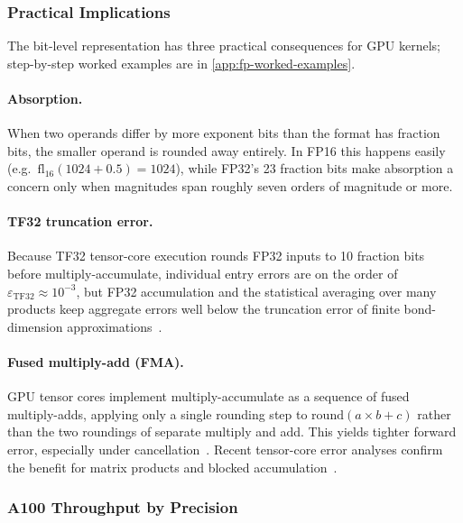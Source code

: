 \subsubsection{Practical Implications}

The bit-level representation has three practical consequences for GPU
kernels; step-by-step worked examples are in \cref{app:fp-worked-examples}.

\paragraph{Absorption.}
When two operands differ by more exponent bits than the format has fraction
bits, the smaller operand is rounded away entirely. In FP16 this happens
easily (e.g.\ $\mathrm{fl}_{16}(1024 + 0.5) = 1024$), while FP32's 23
fraction bits make absorption a concern only when magnitudes span roughly
seven orders of magnitude or more.

\paragraph{TF32 truncation error.}
Because TF32 tensor-core execution rounds FP32 inputs to 10 fraction bits
before multiply-accumulate, individual entry errors are on the order of
$\varepsilon_{\text{TF32}} \approx 10^{-3}$, but FP32 accumulation and the
statistical averaging over many products keep aggregate errors well below
the truncation error of finite bond-dimension
approximations~\cite{markidis2018tensorcore-precision,haidar2018tensorcore-ir,fasi2023multiword-tensorcore}.

\paragraph{Fused multiply-add (FMA).}
GPU tensor cores implement multiply-accumulate as a sequence of fused
multiply-adds, applying only a single rounding step to
$\mathrm{round}(a \times b + c)$ rather than the two roundings of separate
multiply and add. This yields tighter forward error, especially under
cancellation~\cite{ieee754-2019,higham2002accuracy,jeannerod2017fma-complex}.
Recent tensor-core error analyses confirm the benefit for matrix products and
blocked accumulation~\cite{fasi2023multiword-tensorcore}.

\subsubsection{A100 Throughput by Precision}\label{sec:a100-fp-throughput}

